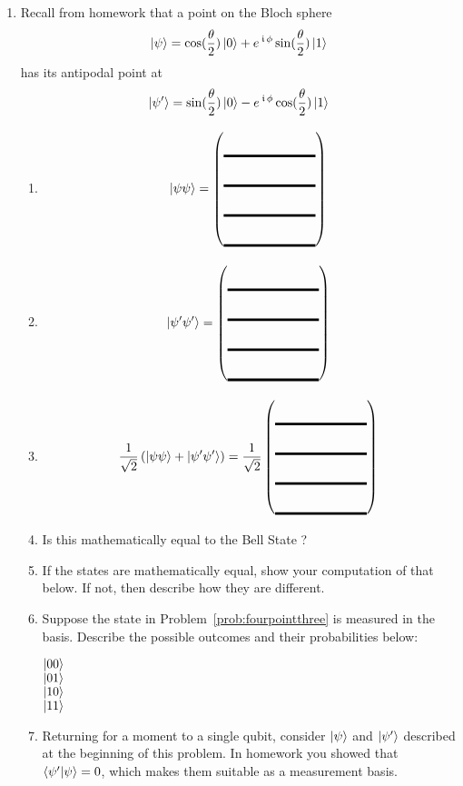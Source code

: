 \documentclass[12pt]{article}
\def\TwoQBlank{%
\DQB{\Blank}{\Blank}{\Blank}{\Blank}%
}
\begin{document}
\begin{enumerate}
\begin{enumerate}[label=\theenumi.\arabic*]
    \LeaveSpace[2in]{}
\end{enumerate}
\item Recall from homework that a point on the Bloch sphere
\[
\ket{\psi} = \cos(\frac{\theta}{2})\ket{0}
    + e^{\,\kern 0.5pt\mathfrak{i}\,\phi}\sin(\frac{\theta}{2})\ket{1}
\]
has its antipodal point at
        \[
        \ket{\psi'}= \sin({\frac{\theta}{2})\ket{0}-e^{\,\kern 0.5pt\mathfrak{i}\,\phi}\cos({\frac{\theta}{2}})\ket{1}}
        \]
\begin{enumerate}[label=\theenumi.\arabic*]
\item \[
\ket{\psi\psi} = \TwoQBlank{}
\]
\item \[
\ket{\psi'\psi'} = \TwoQBlank{}
\]
\item\label{prob:fourpointthree}
\[
\TwoSup{\psi\psi}{\psi'\psi'} = \RootTwo{}\TwoQBlank{}
\]
\item Is this mathematically equal to the Bell State ? \Blank{}
\clearpage\item If the states are mathematically equal, show your computation of that below.  If not, then describe how they are different.
\LeaveSpace{}
\item Suppose the state in Problem~\ref{prob:fourpointthree} is measured in the \TensProd{\PauliZ}{\PauliZ} basis.  Describe the possible outcomes and their probabilities below:
\begin{description}
    \item[$\ket{00}$] \Blank[3in]{}
    \item[$\ket{01}$] \Blank[3in]{}
    \item[$\ket{10}$] \Blank[3in]{}
    \item[$\ket{11}$] \Blank[3in]{}
\end{description}
\item Returning for a moment to a single qubit, consider $\ket{\psi}$ and $\ket{\psi'}$ described at the beginning of this problem. In homework you showed that $\braket{\psi'|\psi}=0$, which makes them suitable as a measurement basis.


\end{enumerate}
\end{enumerate}
\end{document}
